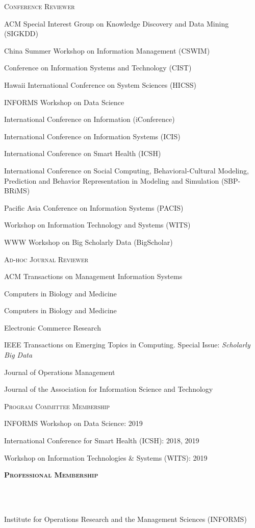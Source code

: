 \documentclass{article}
\newcommand{\header}[1]{{
\hspace*{-15pt}\vspace*{6pt} \textbf{\textsc{\large{#1}}}} \vspace*{-6pt} 
\lineunder
}
\newcommand{\lineunder}{
\vspace*{-8pt} \\ \hspace*{-15pt} 
\hrulefill \\
}
\renewcommand{\labelitemii}{
$\vcenter{\hbox{\tiny$\bullet$}}$\hspace*{-3pt}
}
\newenvironment{bullet-list-major}{
\begin{list}{\labelitemii}{\setlength\leftmargin{3pt} 
\topsep 0pt \itemsep -2pt}}{\vspace*{4pt}\end{list}
}
\begin{document}
\begin{bullet-list-major}
  \item [\hspace{10pt}\textsc{\normalsize{Conference Reviewer}}]
  \item ACM Special Interest Group on Knowledge Discovery and Data Mining (SIGKDD)
    \item China Summer Workshop on Information Management (CSWIM)
  \item Conference on Information Systems and Technology (CIST)
  \item Hawaii International Conference on System Sciences (HICSS)
  \item INFORMS Workshop on Data Science
  \item International Conference on Information (iConference)
  \item International Conference on Information Systems (ICIS)
  \item International Conference on Smart Health (ICSH)
  \item International Conference on Social Computing, Behavioral-Cultural Modeling, Prediction and Behavior Representation in Modeling and Simulation (SBP-BRiMS)
  \item Pacific Asia Conference on Information Systems (PACIS)
  \item Workshop on Information Technology and Systems (WITS)
  \item WWW Workshop on Big Scholarly Data (BigScholar)
\end{bullet-list-major}
\begin{bullet-list-major}
    \item [\hspace{10pt}\textsc{\normalsize{Ad-hoc Journal Reviewer}}]
    \item ACM Transactions on Management Information Systems 
    \item Computers in Biology and Medicine
    \item Computers in Biology and Medicine
    \item Electronic Commerce Research
    \item IEEE Transactions on Emerging Topics in Computing. Special Issue: \textit{Scholarly Big Data}
    \item Journal of Operations Management
    \item Journal of the Association for Information Science and Technology
\end{bullet-list-major}
\begin{bullet-list-major}
    \item [\hspace{10pt}\textsc{\normalsize{Program Committee Membership}}]
    \item INFORMS Workshop on Data Science: 2019
    \item International Conference for Smart Health (ICSH): 2018, 2019
    \item Workshop on Information Technologies \& Systems (WITS): 2019
\end{bullet-list-major}

\vspace*{4pt}
\header{Professional Membership}
\begin{bullet-list-major}
\item Institute for Operations Research and the Management Sciences (INFORMS)
\end{bullet-list-major}
\end{document}
